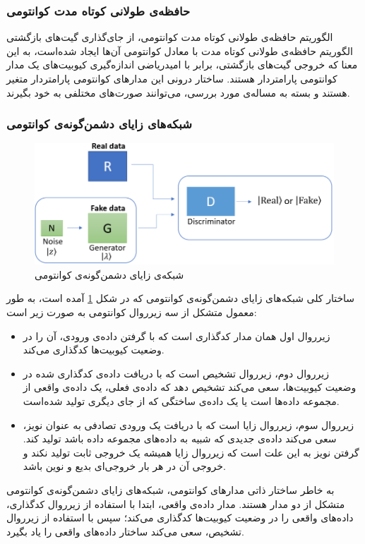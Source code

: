 \subsubsection{حافظه‌ی طولانی کوتاه مدت کوانتومی} \label{sec:qlstm}
الگوریتم حافظه‌ی طولانی کوتاه مدت کوانتومی، از جای‌گذاری گیت‌های بازگشتی الگوریتم حافظه‌ی طولانی کوتاه مدت با معادل کوانتومی آن‌ها ایجاد شده‌است، به این معنا که خروجی گیت‌های بازگشتی، برابر با امیدریاضی اندازه‌گیری کیوبیت‌های یک مدار کوانتومی پارامتردار هستند. 
ساختار درونی این مدارهای کوانتومی پارامتردار متغیر هستند و بسته به مساله‌ی مورد بررسی، می‌توانند صورت‌های مختلفی به خود بگیرند.

\subsubsection{شبکه‌های زایای دشمن‌گونه‌ی کوانتومی} \label{sec:qugan}

\begin{figure}
	\centering
	\includegraphics[scale=0.4]{figures/qugan.png}
	\caption{شبکه‌ی زایای دشمن‌گونه‌ی کوانتومی}
	\label{fig:qugan}
\end{figure}

ساختار کلی شبکه‌های زایای دشمن‌گونه‌ی کوانتومی که در شکل 
\ref{fig:qugan}
آمده است، به طور معمول متشکل از سه زیرروال کوانتومی به صورت زیر است:
\begin{itemize}
    \item زیرروال اول همان مدار کدگذاری است که با گرفتن داده‌ی ورودی، آن را در وضعیت کیوبیت‌ها کدگذاری می‌کند.
    \item زیرروال دوم، زیرروال تشخیص است که با دریافت داده‌ی کدگذاری شده در وضعیت کیوبیت‌ها، سعی می‌کند تشخیص دهد که داده‌ی فعلی، یک داده‌ی واقعی از مجموعه داده‌ها است یا یک داده‌ی ساختگی که از جای دیگری تولید شده‌است.
    \item زیرروال سوم، زیرروال زایا است که با دریافت یک ورودی تصادفی به عنوان نویز، سعی می‌کند داده‌ی جدیدی که شبیه به داده‌های مجموعه داده باشد تولید کند. گرفتن نویز به این علت است که زیرروال زایا همیشه یک خروجی ثابت تولید نکند و خروجی آن در هر بار خروجی‌ای بدیع و نوین باشد.
\end{itemize}
به خاطر ساختار ذاتی مدارهای کوانتومی، شبکه‌های زایای دشمن‌گونه‌ی کوانتومی متشکل از دو مدار هستند.
مدار داده‌ی واقعی، ابتدا با استفاده از زیرروال کدگذاری، داده‌های واقعی را در وضعیت کیوبیت‌ها کدگذاری می‌کند؛ سپس با استفاده از زیرروال تشخیص، سعی می‌کند ساختار داده‌های واقعی را یاد بگیرد.

